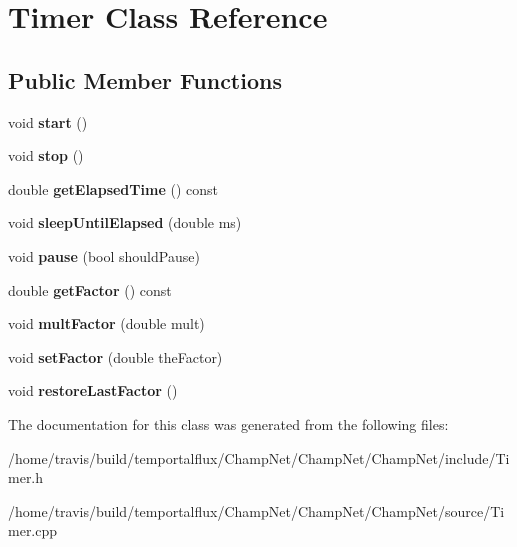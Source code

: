\hypertarget{class_timer}{\section{Timer Class Reference}
\label{class_timer}
}
\subsection*{Public Member Functions}
\begin{DoxyCompactItemize}
\item 
\hypertarget{class_timer_a3a8b5272198d029779dc9302a54305a8}{void {\bfseries start} ()}\label{class_timer_a3a8b5272198d029779dc9302a54305a8}

\item 
\hypertarget{class_timer_a63f0eb44b27402196590a03781515dba}{void {\bfseries stop} ()}\label{class_timer_a63f0eb44b27402196590a03781515dba}

\item 
\hypertarget{class_timer_ad306e18f8d8a0296e001683f92d7f86e}{double {\bfseries get\-Elapsed\-Time} () const }\label{class_timer_ad306e18f8d8a0296e001683f92d7f86e}

\item 
\hypertarget{class_timer_a918584568a93c6cff18e3fddca0c1d44}{void {\bfseries sleep\-Until\-Elapsed} (double ms)}\label{class_timer_a918584568a93c6cff18e3fddca0c1d44}

\item 
\hypertarget{class_timer_a3697dc7e11780a904fee957f2f1b2a36}{void {\bfseries pause} (bool should\-Pause)}\label{class_timer_a3697dc7e11780a904fee957f2f1b2a36}

\item 
\hypertarget{class_timer_ac2e8200d547385c0bff2d836716b0a2d}{double {\bfseries get\-Factor} () const }\label{class_timer_ac2e8200d547385c0bff2d836716b0a2d}

\item 
\hypertarget{class_timer_a0e116daa696f3d5cd9dc3d2092606761}{void {\bfseries mult\-Factor} (double mult)}\label{class_timer_a0e116daa696f3d5cd9dc3d2092606761}

\item 
\hypertarget{class_timer_a0da285550f750a5ba6c16e5766785883}{void {\bfseries set\-Factor} (double the\-Factor)}\label{class_timer_a0da285550f750a5ba6c16e5766785883}

\item 
\hypertarget{class_timer_a7e8da31c3ef153c7b89ea971a4674476}{void {\bfseries restore\-Last\-Factor} ()}\label{class_timer_a7e8da31c3ef153c7b89ea971a4674476}

\end{DoxyCompactItemize}


The documentation for this class was generated from the following files\-:\begin{DoxyCompactItemize}
\item 
/home/travis/build/temportalflux/\-Champ\-Net/\-Champ\-Net/\-Champ\-Net/include/Timer.\-h\item 
/home/travis/build/temportalflux/\-Champ\-Net/\-Champ\-Net/\-Champ\-Net/source/Timer.\-cpp\end{DoxyCompactItemize}
